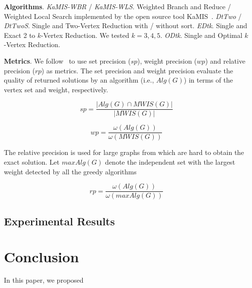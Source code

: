 \documentclass[sigconf, nonacm]{acmart}
\begin{document}
\noindent\textbf{Algorithms}. \emph{KaMIS-WBR} / \emph{KaMIS-WLS}. Weighted Branch and Reduce / Weighted Local Search implemented by the open source tool KaMIS~\cite{Lamm0SWZ19}. \emph{DtTwo} / \emph{DtTwoS}. Single and Two-Vertex Reduction with / without sort. \emph{EDtk}.  Single and Exact 2 to $k$-Vertex Reduction. We tested $k=3,4,5$. \emph{ODtk}. Single and Optimal $k$-Vertex Reduction.

\noindent\textbf{Metrics}. We follow~\citet{Zheng:2020aa} to use set precision ($sp$), weight precision ($wp$) and relative precision ($rp$) as metrics. The set precision and weight precision evaluate the quality of returned solutions by an algorithm (i.e., $Alg(G)$) in terms of the vertex set and weight, respectively.

\begin{equation}
sp = \frac{|Alg(G)\cap MWIS(G)|}{|MWIS(G)|}
\end{equation}

\begin{equation}
wp = \frac{\omega(Alg(G))}{\omega(MWIS(G))}
\end{equation}

The relative precision is used for large graphs from which are hard to obtain the exact solution. Let $maxAlg(G)$ denote the independent set with the largest weight detected by all the greedy algorithms

\begin{equation}
rp = \frac{\omega(Alg(G))}{\omega(maxAlg(G))}
\end{equation}

\subsection{Experimental Results}

\section{Conclusion}

In this paper, we proposed 



\end{document}
